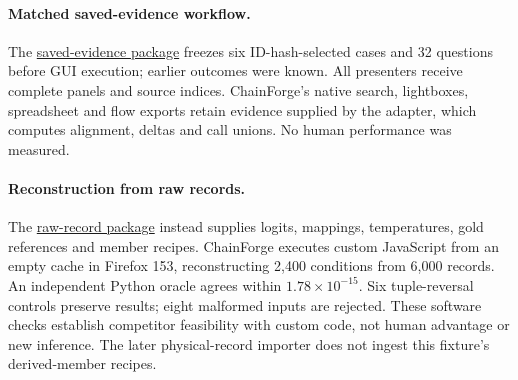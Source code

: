 \documentclass[11pt]{article}
\begin{document}
\paragraph{Matched saved-evidence workflow.}
The \href{https://github.com/UpHash-Network/mini-jev/tree/research/naacl2027-demo/paper/naacl2027/workflow_comparison_20261002}{saved-evidence package} freezes six ID-hash-selected cases and 32 questions before GUI execution; earlier outcomes were known. All presenters receive complete panels and source indices. ChainForge's native search, lightboxes, spreadsheet and flow exports retain evidence supplied by the adapter, which computes alignment, deltas and call unions. No human performance was measured.

\paragraph{Reconstruction from raw records.}
The \href{https://github.com/UpHash-Network/mini-jev/tree/research/naacl2027-demo/paper/naacl2027/raw_workflow_20261002}{raw-record package} instead supplies logits, mappings, temperatures, gold references and member recipes. ChainForge executes custom JavaScript from an empty cache in Firefox 153, reconstructing 2,400 conditions from 6,000 records. An independent Python oracle agrees within $1.78\times10^{-15}$. Six tuple-reversal controls preserve results; eight malformed inputs are rejected. These software checks establish competitor feasibility with custom code, not human advantage or new inference. The later physical-record importer does not ingest this fixture's derived-member recipes.
\end{document}
